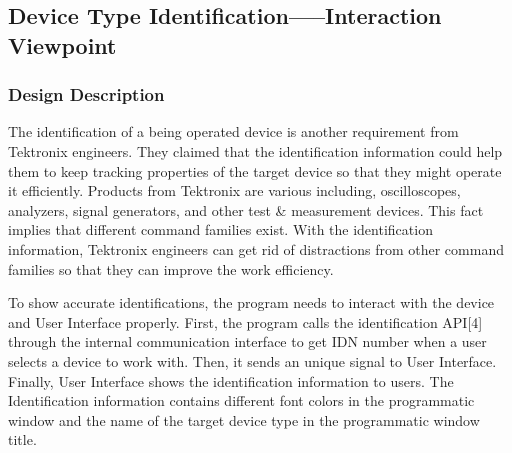 \documentclass [10pt]{article}
\begin{document}
\subsection{Device Type Identification-----Interaction Viewpoint}
\subsubsection{Design Description}
The identification of a being operated device is another requirement from Tektronix engineers. They claimed that the identification information could help them to keep tracking properties of the target device so that they might operate it efficiently. Products from Tektronix are various including, oscilloscopes, analyzers, signal generators, and other test \& measurement devices. This fact implies that different command families exist. With the identification information, Tektronix engineers can get rid of distractions from other command families so that they can improve the work efficiency. \par
    To show accurate identifications, the program needs to interact with the device and User Interface properly. First, the program calls the identification API[4] through the internal communication interface to get IDN number when a user selects a device to work with. Then, it sends an unique signal to User Interface. Finally, User Interface shows the identification information to users. The Identification information contains different font colors in the programmatic window and the name of the target device type in the programmatic window title. 
\end{document}
